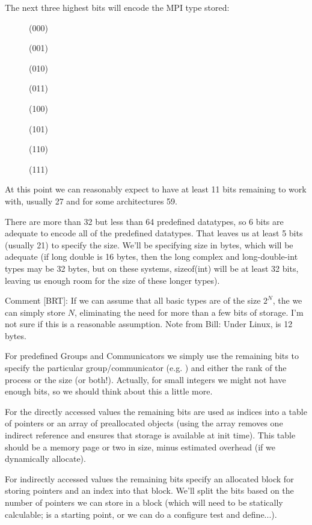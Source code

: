 \documentclass{article}
\begin{document}
The next three highest bits will encode the MPI type stored:
\begin{description}
\item[]     (000)
\item[]    (001)
\item[] (010)
\item[]     (011)
\item[](100)
\item[]       (101)
\item[]     (110)
\item[]      (111)
\end{description}

At this point we can reasonably expect to have at least 11 bits remaining
to work with, usually 27 and for some architectures 59.

There are more than 32 but less than 64 predefined datatypes, so 6 bits are
adequate to encode all of the predefined datatypes.
That leaves us at least 5 bits
(usually 21) to specify the size.  We'll be specifying size in bytes,
which will be adequate (if long double is 16 bytes, then the long complex and
long-double-int types may be 32 bytes, but on these systems, sizeof(int) will
be at least 32 bits, leaving us enough room for the size of these longer
types). 

Comment [BRT]: If we can assume that all basic types are of the size
$2^N$, the we can simply store $N$, eliminating the need for more than a
few bits of storage.  I'm not sure if this is a reasonable
assumption.  Note from Bill: Under Linux,  is 12 bytes.

For predefined Groups and Communicators we simply use the remaining bits
to specify the particular group/communicator (e.g. ) and 
either the rank of the process or the size (or both!).  Actually, for
small integers we  
might not have enough bits, so we should think about this a little more.

For the directly accessed values the remaining bits are used as indices into
a table of pointers or an array of preallocated objects (using the array
removes one indirect reference and ensures that storage is available at init
time).  This table should be 
a memory page or two in size, 
minus estimated  overhead (if we dynamically allocate).

For indirectly accessed values the remaining bits specify an allocated block
for storing pointers and an index into that block.  We'll split the bits
based on the number of pointers we can store in a block (which will need
to be statically calculable;  is a starting point, or we
can  do a configure test and define...).
\end{document}
